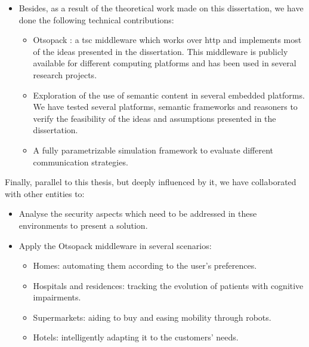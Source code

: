 \begin{itemize}
  \item Besides, as a result of the theoretical work made on this dissertation, we have done the following technical contributions:
    \begin{itemize}
      \item Otsopack : a \ac{tsc} middleware which works over \ac{http} and implements most of the ideas presented in the dissertation.
            This middleware is publicly available for different computing platforms and has been used in several research projects.
      \item Exploration of the use of semantic content in several embedded platforms.
	    We have tested several platforms, semantic frameworks and reasoners to verify the feasibility of the ideas and assumptions presented in the dissertation.
      \item A fully parametrizable simulation framework to evaluate different communication strategies. %
    \end{itemize}
\end{itemize}


Finally, parallel to this thesis, but deeply influenced by it, we have collaborated with other entities to:
\begin{itemize}
  \item Analyse the security aspects which need to be addressed in these environments to present a solution. %
  \item Apply the Otsopack middleware in several scenarios:
    \begin{itemize}
      \item Homes: automating them according to the user's preferences. %
      \item Hospitals and residences: tracking the evolution of patients with cognitive impairments.  %
      \item Supermarkets: aiding to buy and easing mobility through robots.
      \item Hotels: intelligently adapting it to the customers' needs.
    \end{itemize}
\end{itemize}